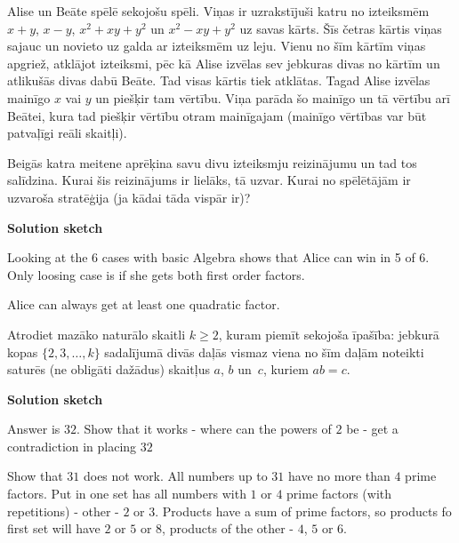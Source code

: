 



\renewcommand{\theenumi}{\alph{enumi}}



\noindent
 
\filbreak

\begin{problem}
Alise un Beāte spēlē sekojošu spēli. Viņas ir uzrakstījuši katru no izteiksmēm $x+y$, $x-y$, $x^2+xy+y^2$ un $x^2-xy+y^2$ uz savas kārts. Šīs četras kārtis viņas sajauc un novieto uz galda ar izteiksmēm uz leju. Vienu no šīm kārtīm viņas apgriež, atklājot izteiksmi, pēc kā Alise izvēlas sev jebkuras divas no kārtīm un atlikušās divas dabū Beāte. Tad visas kārtis tiek atklātas. Tagad Alise izvēlas mainīgo $x$ vai $y$ un piešķir tam vērtību. Viņa parāda šo mainīgo un tā vērtību arī Beātei, kura tad piešķir vērtību otram mainīgajam (mainīgo vērtības var būt patvaļīgi reāli skaitļi).

Beigās katra meitene aprēķina savu divu izteiksmju reizinājumu un tad tos salīdzina. Kurai šis reizinājums ir lielāks, tā uzvar.
Kurai no spēlētājām ir uzvaroša stratēģija (ja kādai tāda vispār ir)?

\textbf{Solution sketch}

Looking at the 6 cases with basic Algebra shows that Alice can win in 5 of 6. Only loosing case is if she gets both first order factors. 

Alice can always get at least one quadratic factor.
\end{problem}

\begin{problem}
Atrodiet mazāko naturālo skaitli $k\geq 2$, kuram piemīt sekojoša īpašība:
jebkurā kopas $\{2,3,\ldots,k\}$ \mbox{sadalījumā} divās daļās vismaz viena no šīm daļām noteikti saturēs
(ne obligāti dažādus) skaitļus $a$, $b$ un~$c$,
kuriem $ab=c$.

\textbf{Solution sketch}

Answer is $32$.
Show that it works - where can the powers of $2$ be - get a contradiction in placing $32$


Show that $31$ does not work. All numbers up to $31$ have no more than $4$ prime factors. Put in one set has all numbers with $1$ or $4$ prime factors (with repetitions) - other - $2$ or $3$. Products have a sum of prime factors, so products fo first set will have $2$ or $5$ or $8$, products of the other - $4$, $5$ or $6$.
\end{problem}


